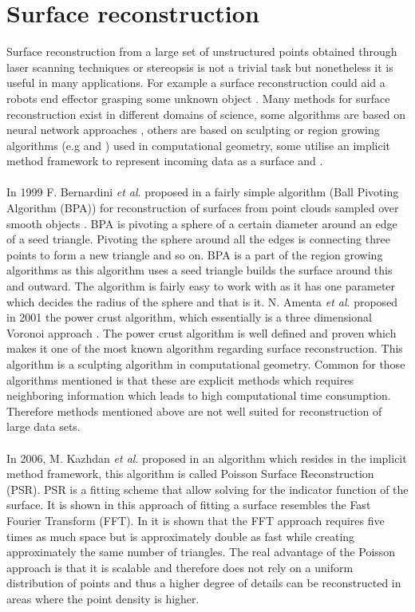 \section{Surface reconstruction}
Surface reconstruction from a large set of unstructured points obtained through laser scanning techniques or stereopsis is not a trivial task but nonetheless it is useful in many applications. For example a surface reconstruction could aid a robots end effector grasping some unknown object \cite{Wang2005}. Many methods for surface reconstruction exist in different domains of science, some algorithms are based on neural network approaches  \cite{Wu2007}, others are based on sculpting or region growing algorithms (e.g \cite{Bernardini1999} and \cite{Amenta2001}) used in computational geometry, some utilise an implicit method framework to represent incoming data as a surface \cite{Kazhdan2006} and \cite{Dong2011}.\\
\\
In 1999 F. Bernardini \textit{et al}. proposed in a fairly simple algorithm (Ball Pivoting Algorithm (BPA)) for reconstruction of surfaces from point clouds sampled over smooth objects \cite{Bernardini1999}. BPA is pivoting a sphere of a certain diameter around an edge of a seed triangle. Pivoting the sphere around all the edges is connecting three points to form a new triangle and so on. BPA is a part of the region growing algorithms as this algorithm uses a seed triangle builds the surface around this and outward. The algorithm is fairly easy to work with as it has one parameter which decides the radius of the sphere and that is it. N. Amenta \textit{et al}. proposed in 2001 \cite{Amenta2001} the power crust algorithm, which essentially is a three dimensional Voronoi approach \cite{Ledoux2007}. The power crust algorithm is well defined and proven which makes it one of the most known algorithm regarding surface reconstruction. This algorithm is a sculpting algorithm in computational geometry. Common for those algorithms mentioned is that these are explicit methods which requires neighboring information which leads to high computational time consumption. Therefore methods mentioned above are not well suited for reconstruction of large data sets.\\
\\
In 2006, M. Kazhdan \textit{et al}. proposed in \cite{Kazhdan2006} an algorithm which resides in the implicit method framework, this algorithm is called Poisson Surface Reconstruction (PSR). PSR is a fitting scheme that allow solving for the indicator function of the surface. It is shown in \cite{Kazhdan2006} this approach of fitting a surface resembles the Fast Fourier Transform (FFT). In \cite{Kazhdan2006} it is shown that the FFT approach requires five times as much space but is approximately double as fast while creating approximately the same number of triangles. The real advantage of the Poisson approach is that it is scalable and therefore does not rely on a uniform distribution of points and thus a higher degree of details can be reconstructed in areas where the point density is higher.\\
